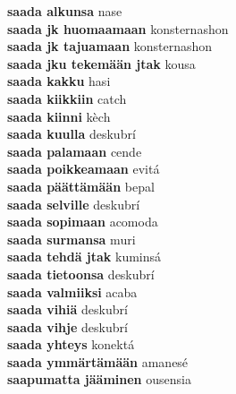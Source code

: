 \textbf{ saada alkunsa  } nase \\
\textbf{ saada jk huomaamaan  } konsternashon \\
\textbf{ saada jk tajuamaan  } konsternashon \\
\textbf{ saada jku tekemään jtak  } kousa \\
\textbf{ saada kakku  } hasi \\
\textbf{ saada kiikkiin  } catch \\
\textbf{ saada kiinni  } kèch \\
\textbf{ saada kuulla  } deskubrí \\
\textbf{ saada palamaan  } cende \\
\textbf{ saada poikkeamaan  } evitá \\
\textbf{ saada päättämään  } bepal \\
\textbf{ saada selville  } deskubrí \\
\textbf{ saada sopimaan  } acomoda \\
\textbf{ saada surmansa  } muri \\
\textbf{ saada tehdä jtak  } kuminsá \\
\textbf{ saada tietoonsa  } deskubrí \\
\textbf{ saada valmiiksi  } acaba \\
\textbf{ saada vihiä  } deskubrí \\
\textbf{ saada vihje  } deskubrí \\
\textbf{ saada yhteys  } konektá \\
\textbf{ saada ymmärtämään  } amanesé \\
\textbf{ saapumatta jääminen  } ousensia \\
